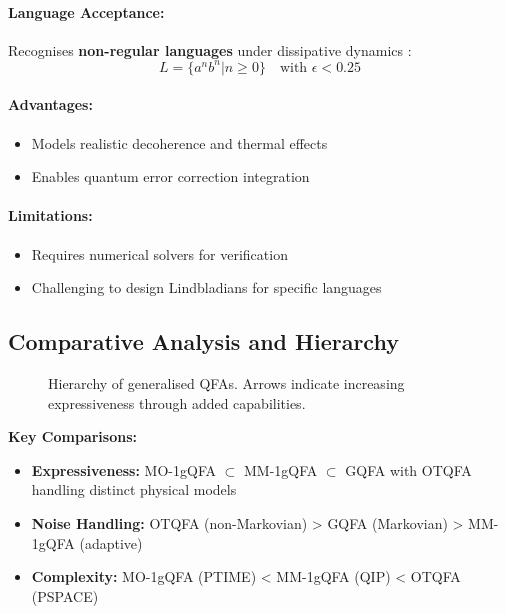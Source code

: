 \paragraph{Language Acceptance:}
Recognises \textbf{non-regular languages} under dissipative dynamics \cite{hirvensalo2012quantum}:
\[
L = \{a^nb^n | n \geq 0\} \quad \text{with } \epsilon < 0.25 
\]
\cite{hirvensalo2012quantum}

\paragraph{Advantages:}
\begin{itemize}
    \item Models realistic decoherence and thermal effects
    \item Enables quantum error correction integration
\end{itemize}

\paragraph{Limitations:}
\begin{itemize}
    \item Requires numerical solvers for verification
    \item Challenging to design Lindbladians for specific languages
\end{itemize}

\subsection*{Comparative Analysis and Hierarchy}
\begin{figure}[h]
\centering
{}
\caption{Hierarchy of generalised QFAs. Arrows indicate increasing expressiveness through added capabilities.}
\label{fig:gqfa-hierarchy}
\end{figure}

\textbf{Key Comparisons:}
\begin{itemize}
    \item \textbf{Expressiveness:} MO-1gQFA $\subset$ MM-1gQFA $\subset$ GQFA with OTQFA handling distinct physical models
    \item \textbf{Noise Handling:} OTQFA (non-Markovian) > GQFA (Markovian) > MM-1gQFA (adaptive)
    \item \textbf{Complexity:} MO-1gQFA (PTIME) < MM-1gQFA (QIP) < OTQFA (PSPACE)
\end{itemize}